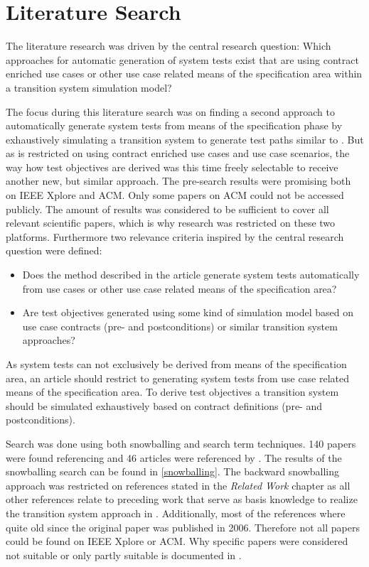 \section{Literature Search} \label{literaturesearch}

The literature research was driven by the central research question: \glqq Which approaches for automatic generation of system tests exist that are using contract enriched use cases or other use case related means of the specification area within a transition system simulation model?\grqq 

The focus during this literature search was on finding a second approach to automatically generate system tests from means of the specification phase by exhaustively simulating a transition system to generate test paths similar to \cite{ClementineNebut2006}. But as \cite{ClementineNebut2006} is restricted on using contract enriched use cases and use case scenarios, the way how test objectives are derived was this time freely selectable to receive another new, but similar approach. The pre-search results were promising both on IEEE Xplore and ACM. Only some papers on ACM could not be accessed publicly. The amount of results was considered to be sufficient to cover all relevant scientific papers, which is why research was restricted on these two platforms. Furthermore two relevance criteria inspired by the central research question were defined:

\begin{itemize}
	\item Does the method described in the article generate system tests automatically from use cases or other use case related means of the specification area?
	\item Are test objectives generated using some kind of simulation model based on use case contracts (pre- and postconditions) or similar transition system approaches?
\end{itemize} 

As system tests can not exclusively be derived from means of the specification area, an article should restrict to generating system tests from use case related means of the specification area. To derive test objectives a transition system should be simulated exhaustively based on contract definitions (pre- and postconditions). 

Search was done using both snowballing and search term techniques. 140 papers were found referencing \cite{ClementineNebut2006} and 46 articles were referenced by \cite{ClementineNebut2006}. The results of the snowballing search can be found in \autoref{snowballing}. The backward snowballing approach was restricted on references stated in the \textit{Related Work} chapter as all other references relate to preceding work that serve as basis knowledge to realize the transition system approach in \cite{ClementineNebut2006}. Additionally, most of the references where quite old since the original paper was published in 2006. Therefore not all papers could be found on IEEE Xplore or ACM. Why specific papers were considered not suitable or only partly suitable is documented in \cite{FelixHausberger2020}.

